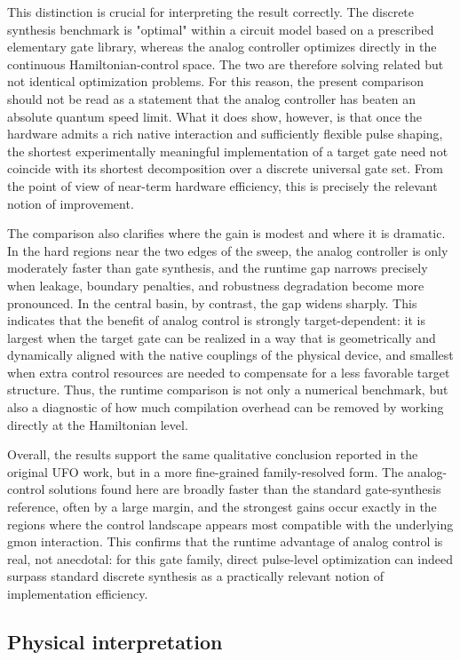 This distinction is crucial for interpreting the result correctly. The discrete synthesis benchmark is "optimal"
within a circuit model based on a prescribed elementary gate library, whereas the analog controller optimizes
directly in the continuous Hamiltonian-control space. The two are therefore solving related but not identical
optimization problems. For this reason, the present comparison should not be read as a statement that the analog
controller has beaten an absolute quantum speed limit. What it does show, however, is that once the hardware admits
a rich native interaction and sufficiently flexible pulse shaping, the shortest experimentally meaningful
implementation of a target gate need not coincide with its shortest decomposition over a discrete universal gate set.
From the point of view of near-term hardware efficiency, this is precisely the relevant notion of improvement.

The comparison also clarifies where the gain is modest and where it is dramatic. In the hard regions near the two
edges of the sweep, the analog controller is only moderately faster than gate synthesis, and the runtime gap narrows
precisely when leakage, boundary penalties, and robustness degradation become more pronounced. In the central basin,
by contrast, the gap widens sharply. This indicates that the benefit of analog control is strongly target-dependent:
it is largest when the target gate can be realized in a way that is geometrically and dynamically aligned with the
native couplings of the physical device, and smallest when extra control resources are needed to compensate for a
less favorable target structure. Thus, the runtime comparison is not only a numerical benchmark, but also a
diagnostic of how much compilation overhead can be removed by working directly at the Hamiltonian level.

Overall, the results support the same qualitative conclusion reported in the original UFO work, but in a more
fine-grained family-resolved form. The analog-control solutions found here are broadly faster than the standard
gate-synthesis reference, often by a large margin, and the strongest gains occur exactly in the regions where the
control landscape appears most compatible with the underlying gmon interaction. This confirms that the runtime
advantage of analog control is real, not anecdotal: for this gate family, direct pulse-level optimization can indeed
surpass standard discrete synthesis as a practically relevant notion of implementation efficiency.

\subsection{Physical interpretation}
\label{subsec:physical_interpretation}

